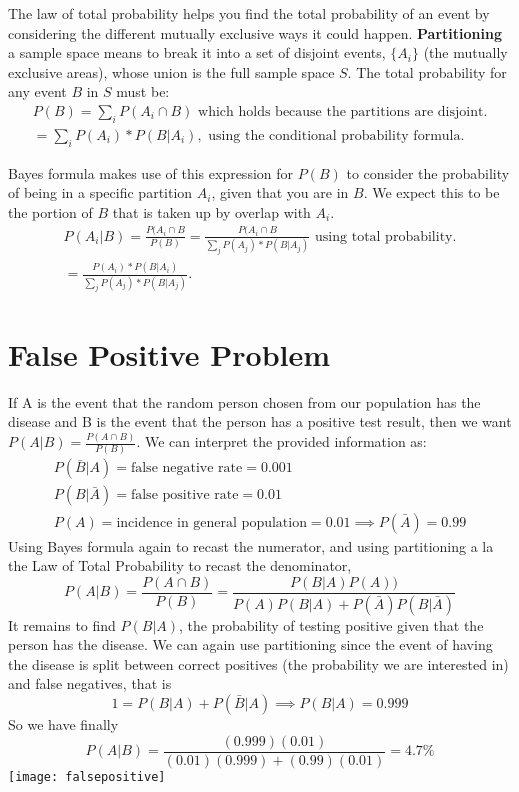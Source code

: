 The law of total probability helps you find the total probability of an event by considering the different mutually exclusive ways it could happen. \textbf{Partitioning} a sample space means to break it into a set of disjoint events, $\{A_i\}$ (the mutually exclusive areas), whose union is the full sample space $S$. The total probability for any event $B$ in $S$ must be:
\begin{align}
P(B) = \sum_iP(A_i\cap B) \textrm{ which holds because the partitions are disjoint.}\\
= \sum_iP(A_i)*P(B|A_i), \textrm{ using the conditional probability formula.}
\end{align}

Bayes formula makes use of this expression for $P(B)$ to consider the probability of being in a specific partition $A_i$, given that you are in $B$. We expect this to be the portion of $B$ that is taken up by overlap with $A_i$.
\begin{align}
P(A_i|B) = \frac{P(A_i\cap B}{P(B)} = \frac{P(A_i\cap B}{\sum_jP(A_j)*P(B|A_j)} \textrm{ using total probability.}\\
= \frac{P(A_i)*P(B|A_i)}{\sum_jP(A_j)*P(B|A_j)}.
\end{align}


\section{False Positive Problem}
If A is the event that the random person chosen from our population has the disease and B is the event that the person has a positive test result, then we want $P(A|B) = \frac{P(A\cap B)}{P(B)}$. 
\n
We can interpret the provided information as:
\begin{align}
P(\bar{B}|A) = \text{false negative rate} = 0.001\\
P(B|\bar{A}) = \text{false positive rate} = 0.01\\
P(A) = \text{incidence in general population} = 0.01 \implies P(\bar{A}) = 0.99
\end{align}
Using Bayes formula again to recast the numerator, and using partitioning a la the Law of Total Probability to recast the denominator, 
\begin{equation}
P(A|B) = \frac{P(A\cap B)}{P(B)} = \frac{P(B|A)P(A))}{P(A)P(B|A)+P(\bar{A})P(B|\bar{A})}
\end{equation}
It remains to find $P(B|A)$, the probability of testing positive given that the person has the disease. We can again use partitioning since the event of having the disease is split between correct positives (the probability we are interested in) and false negatives, that is
\begin{equation}
1 = P(B|A) + P(\bar{B}|A) \implies P(B|A) = 0.999
\end{equation}
So we have finally
\begin{equation}
P(A|B) = \frac{(0.999)(0.01)}{(0.01)(0.999)+(0.99)(0.01)} = 4.7\%
\end{equation} 
\texttt{[image: falsepositive]}
\n

